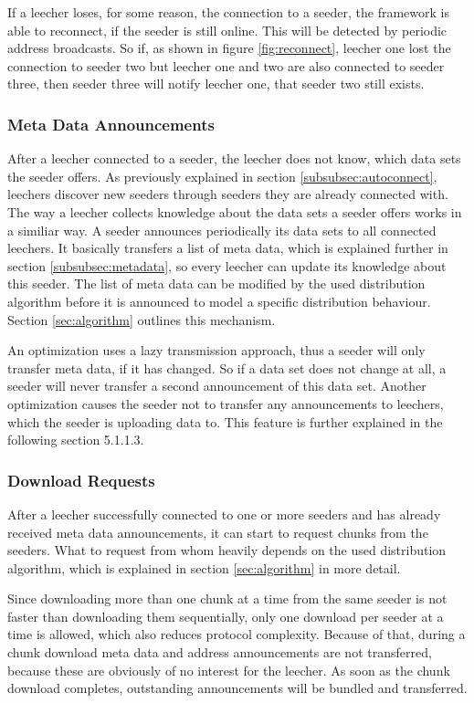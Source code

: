 If a leecher loses, for some reason, the connection to a seeder, the framework is able to reconnect, if the seeder is still online. This will be detected by periodic address broadcasts. So if, as shown in figure \ref{fig:reconnect}, leecher one lost the connection to seeder two but leecher one and two are also connected to seeder three, then seeder three will notify leecher one, that seeder two still exists.


\subsubsection{Meta Data Announcements}
After a leecher connected to a seeder, the leecher does not know, which data sets the seeder offers. As previously explained in section \ref{subsubsec:autoconnect}, leechers discover new seeders through seeders they are already connected with. The way a leecher collects knowledge about the data sets a seeder offers works in a similiar way. A seeder announces periodically its data sets to all connected leechers. It basically transfers a list of meta data, which is explained further in section \ref{subsubsec:metadata}, so every leecher can update its knowledge about this seeder. The list of meta data can be modified by the used distribution algorithm before it is announced to model a specific distribution behaviour. Section \ref{sec:algorithm} outlines this mechanism.

An optimization uses a lazy transmission approach, thus a seeder will only transfer meta data, if it has changed. So if a data set does not change at all, a seeder will never transfer a second announcement of this data set. Another optimization causes the seeder not to transfer any announcements to leechers, which the seeder is uploading data to. This feature is further explained in the following section 5.1.1.3.


\subsubsection{Download Requests}
\label{subsubsec:downloadreq}
After a leecher successfully connected to one or more seeders and has already received meta data announcements, it can start to request chunks from the seeders. What to request from whom heavily depends on the used distribution algorithm, which is explained in section \ref{sec:algorithm} in more detail. 

Since downloading more than one chunk at a time from the same seeder is not faster than downloading them sequentially, only one download per seeder at a time is allowed, which also reduces protocol complexity. Because of that, during a chunk download meta data and address announcements are not transferred, because these are obviously of no interest for the leecher. As soon as the chunk download completes, outstanding announcements will be bundled and transferred.

